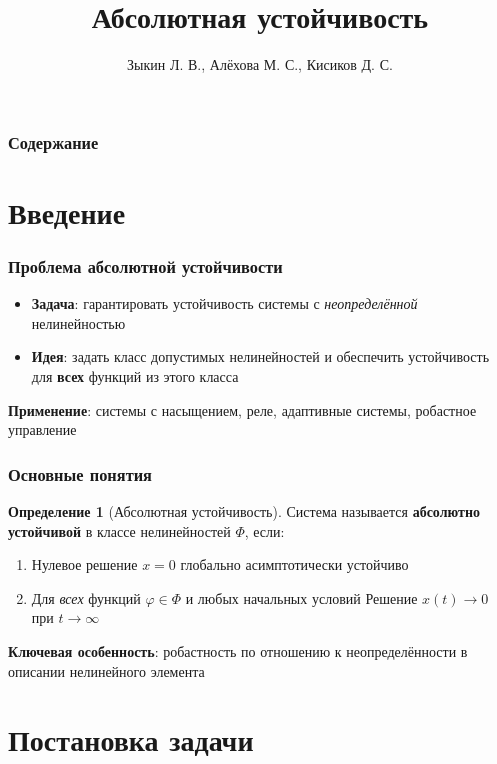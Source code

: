 \documentclass[14pt,aspectratio=169]{beamer}
\title{Абсолютная устойчивость}
\author{Зыкин Л. В., Алёхова М. С., Кисиков Д. С.}
\institute{Университет ИТМО \\ Факультет систем управления и робототехники}
\date{}
\theoremstyle{definition}
\newtheorem{defn}{Определение}
\theoremstyle{plain}
\begin{document}
\frame{\titlepage}

\begin{frame}
\frametitle{Содержание}
\tableofcontents
\end{frame}

\section{Введение}

\begin{frame}
\frametitle{Проблема абсолютной устойчивости}
\begin{itemize}
    \item \textbf{Задача}: гарантировать устойчивость системы с \emph{неопределённой} нелинейностью
    \item \textbf{Идея}: задать класс допустимых нелинейностей и обеспечить устойчивость для \textbf{всех} функций из этого класса
    
\end{itemize}

\vspace{10pt}
\textbf{Применение}: системы с насыщением, реле, адаптивные системы, робастное управление
\end{frame}

\begin{frame}
\frametitle{Основные понятия}
\begin{defn}[Абсолютная устойчивость]
Система называется \textbf{абсолютно устойчивой} в классе нелинейностей $\Phi$, если:
\begin{enumerate}
    \item Нулевое решение $x=0$ глобально асимптотически устойчиво
    \item Для \emph{всех} функций $\varphi\in\Phi$ и любых начальных условий
    Решение $x(t)\to 0$ при $t\to\infty$
\end{enumerate}
\end{defn}

\vspace{10pt}
\textbf{Ключевая особенность}: робастность по отношению к неопределённости в описании нелинейного элемента
\end{frame}

\section{Постановка задачи}
\end{document}
